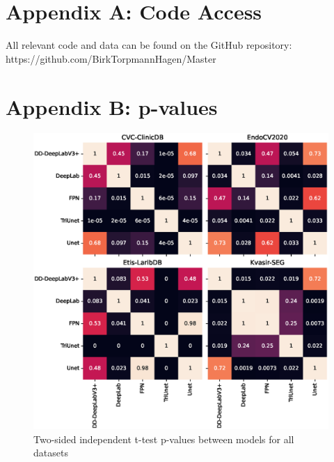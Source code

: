 \chapter*{Appendix A: Code Access} \label{code_data}
All relevant code and data can be found on the GitHub repository: https://github.com/BirkTorpmannHagen/Master

\chapter*{Appendix B: p-values}\label{p-values}

\begin{figure}[hbt]
    \centering
    \includegraphics[width=\linewidth]{illustrations/model_pvals.eps}
    \caption{Two-sided independent t-test p-values between models for all datasets}
    \label{models_pvalues}
\end{figure}
